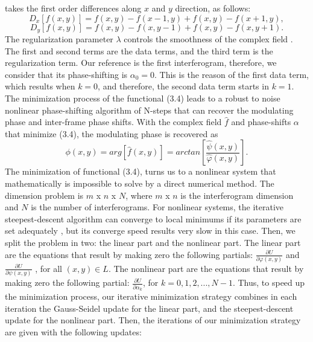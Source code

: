 takes the first order differences along $x$ and $y$ direction, as
follows:
\begin{equation}
D_{x}[f(x,y)]=f(x,y)-f(x-1,y)+f(x,y)-f(x+1,y),
\end{equation}
\begin{equation}
D_{y}[f(x,y)]=f(x,y)-f(x,y-1)+f(x,y)-f(x,y+1).
\end{equation}
The regularization parameter $\lambda$ controls the smoothness of
the complex field \cite{RQF,AQF_mult}. The first and second terms are
the data terms, and the third term is the regularization term. Our
reference is the first interferogram, therefore, we consider that
its phase-shifting is $\alpha_{0}=0$. This is the reason of the first
data term, which results when $k=0$, and therefore, the second data
term starts in $k=1$. The minimization process of the functional
(3.4) leads to a robust to noise nonlinear phase-shifting algorithm
of N-steps that can recover the modulating phase and inter-frame phase
shifts. With the complex field $\widehat{f}$ and phase-shifts $\alpha$
that minimize (3.4), the modulating phase is recovered as 
\begin{equation}
\phi(x,y)=arg[\widehat{f}(x,y)]=arctan\left[\frac{\hat{\psi}(x,y)}{\widehat{
\varphi}(x,y)}\right].\label{eq:fi}
\end{equation}
The minimization of functional (3.4), turns us to a nonlinear system
that mathematically is impossible to solve by a direct numerical method.
The dimension problem is $m$ x $n$ x $N$, where $m$ x $n$ is
the interferogram dimension and $N$ is the number of interferograms.
For nonlinear systems, the iterative\emph{ }steepest-descent algorithm
can converge to local minimums if its parameters are set adequately
\cite{Nocedal}, but its converge speed results very slow in this case.
Then, we split the problem in two: the linear part and the nonlinear
part. The linear part are the equations that result by making zero
the following partials: $\frac{\partial U}{\partial\varphi(x,y)}$
and $\frac{\partial U}{\partial\psi(x,y)}$ , for all $(x,y)\in L$.
The nonlinear part are the equations that result by making zero the
following partial: $\frac{\partial U}{\partial\alpha_{k}}$, for $k=0,1,2,...,N-
1$.
Thus, to speed up the minimization process, our iterative minimization
strategy combines in each iteration the Gauss-Seidel update for the
linear part, and the steepest-descent update for the nonlinear part.
Then, the iterations of our minimization strategy are given with the
following updates: 

